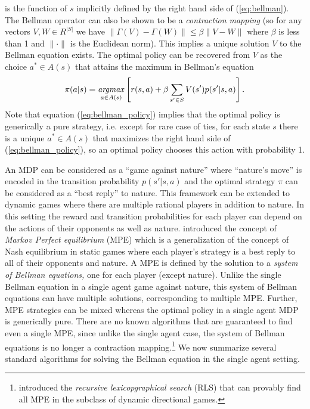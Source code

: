 is the function of $s$ implicitly defined
by the right hand side of (\ref{eq:bellman}). The Bellman operator can also be shown to be a {\it contraction mapping\/} 
(so for any vectors $V,W \in R^{|S|}$ we have $\|\Gamma(V)-\Gamma(W)\| \le \beta \|V-W\|$ where $\beta$ is less than 1
and $\|\cdot\|$ is the Euclidean norm).
This implies a unique solution $V$ to the Bellman equation exists.
The optimal policy can be recovered from $V$ as the choice $a^* \in A(s)$ that attains the maximum in Bellman's equation
\begin{equation}
       \pi(a|s) = \mathop{\it argmax}_{a \in A(s)}\left[ r(s,a)+\beta \sum_{s' \in S} V(s')p(s'|s,a)\right].
\label{eq:bellman_policy}
\end{equation}
Note that equation (\ref{eq:bellman_policy}) implies that the optimal policy is generically a pure strategy, i.e. except for
rare case of ties, for each state $s$ there 
is a unique $a^* \in A(s)$ that maximizes the right hand side of (\ref{eq:bellman_policy}), so an optimal policy chooses this action with probability 1. 

An MDP can be considered as  a ``game against nature'' where ``nature's move'' is encoded in the transition probability $p(s'|s,a)$ and the optimal
strategy $\pi$ can be considered as a ``best reply'' to nature. This framework
can be extended to dynamic games where there are multiple rational players in addition to nature. In this setting the reward and transition probabilities for each player
can depend on the actions of their opponents as well as nature. \citet{MaskinTirole:2001} introduced the concept of {\it Markov Perfect equilibrium\/} (MPE) which is
a generalization of the concept of Nash equilibrium in static games where each player's strategy is a best reply to all of their opponents
and nature. A MPE is defined by the solution to a {\it system of Bellman equations,\/} one for each player (except nature). Unlike the single Bellman equation
in a single agent game against nature, this system of Bellman equations can have multiple solutions, corresponding to multiple MPE. Further, MPE strategies
can be mixed whereas the optimal policy in a single agent MDP is generically pure. 
There are no known algorithms that are guaranteed to find even a single MPE, since unlike the single agent case, the system of Bellman equations
is no longer a contraction mapping.\footnote{\footnotesize \citet{IRS:2015} introduced the {\it recursive lexicopgraphical search\/} (RLS) that can provably find all MPE
in the subclass of dynamic directional games.}
We now summarize several standard algorithms for solving the Bellman equation in the single agent setting.


